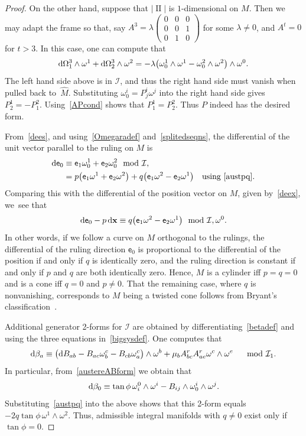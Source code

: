 \documentclass[10pt,a4paper]{amsart}
\def\ve{\mathsf{e}}
\def\vx{\boldsymbol{\mathrm{x}}}
\def\II{\operatorname{II}} %
\def\calI{\mathcal{I}}
\def\w{\omega}
\numberwithin{equation}{section}
\begin{document}
\begin{proof}
On the other hand, suppose that $|\II|$ is $1$-dimensional on $M$. Then we may adapt the frame so that, say $A^3 = \lambda \left(\begin{smallmatrix} 0 & 0 & 0 \\
0 & 0 & 1 \\ 0 & 1 & 0 \end{smallmatrix}\right)$ for some $\lambda\ne0$, and $A^t=0$ for $t>3$. In this case, one can compute that
\begin{gather*}
{\rm d} \Omega^3_1 \wedge \w^1 + {\rm d} \Omega^3_2 \wedge \w^2 = -\lambda \big(\w^1_0 \wedge \w^1 - \w^2_0 \wedge \w^2\big) \wedge \w^0.
\end{gather*}
The left hand side above is in $\calI$, and thus the right hand side must vanish when pulled back to~$\widehat{M}$. Substituting $\w^i_0= P^i_j \w^j$ into the right hand side gives $P^1_2 = - P^2_1$. Using~\eqref{APcond} shows that $P_1^1 = P_2^2$. Thus $P$ indeed has the desired form.

From~\eqref{dees}, and using~\eqref{Omegaradef} and~\eqref{splitedseqns}, the differential of the unit vector parallel to the ruling on $M$ is
\begin{align*}
{\rm d}\ve_0 &\equiv \ve_1\w^1_0 + \ve_2 \w^2_0 \mod \calI, \\
&= p \big(\ve_1 \w^1 + \ve_2 \w^2\big) + q \big(\ve_1 \w^2-\ve_2 \w^1\big) \quad \text{using~\eqref{austpq}.}
\end{align*}
Comparing this with the differential of the position vector on $M$, given by~\eqref{deex}, we~see that
\begin{gather*}
{\rm d}\ve_0 - p\, {\rm d}\vx \equiv q \big(\ve_1 \w^2-\ve_2 \w^1\big) \mod \calI, \w^0.
\end{gather*}
In other words, if we follow a curve on $M$ orthogonal to the rulings, the differential of the ruling direction $\ve_0$ is proportional to the differential of the position
if and only if $q$ is identically zero, and the ruling direction is constant if and only if $p$ and $q$ are both identically zero. Hence, $M$ is a cylinder iff $p=q=0$ and is a cone iff $q=0$ and $p\ne 0$. That the remaining case, where $q$ is nonvanishing, corresponds to $M$ being a twisted cone follows from Bryant's classification~\cite{Br}.

Additional generator 2-forms for $\calI$ are obtained by differentiating~\eqref{betadef} and using the three equations in~\eqref{bigsysdef}. One computes that
\begin{gather} \label{dbetacomp}
{\rm d}\beta_a \equiv \big({\rm d}B_{ab} -B_{ac} \w^c_b - B_{cb} \w^c_a\big) \wedge \w^b + \mu_b A^r_{bc} A^r_{ae} \w^c \wedge \w^e \quad \mod \calI_1.
\end{gather}
In particular, from~\eqref{austereABform} we obtain that
\begin{gather*}
{\rm d}\beta_0 \equiv \tan\phi \,\w^0_i \wedge \w^i -B_{ij} \wedge \w^i_0 \wedge \w^j.
\end{gather*}
Substituting~\eqref{austpq} into the above shows that this 2-form equals $-2q \tan \phi \, \w^1 \wedge \w^2$. Thus, admissible integral manifolds with $q\ne 0$ exist only if $\tan\phi=0$.
\end{proof}
\end{document}
